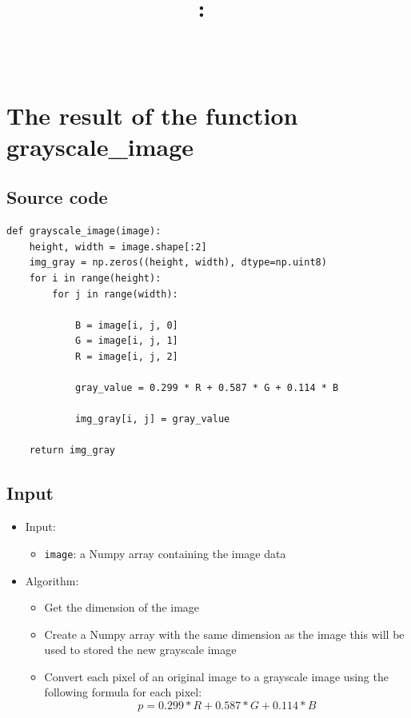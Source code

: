 \documentclass{article}
\title{
\vspace{-1in}
\textmd{\textbf{\hmwkClass:\ \hmwkTitle} \\ \hmwkAuthorName}\\
}
\author{}
\date{}
\begin{document}
\maketitle


\section{The result of the function grayscale\_image}

\subsection{Source code}
\begin{lstlisting}[caption={Code of grayscale\_image() function}, label={grayscale\_image}]
def grayscale_image(image):
    height, width = image.shape[:2]
    img_gray = np.zeros((height, width), dtype=np.uint8)
    for i in range(height):
        for j in range(width):
    
            B = image[i, j, 0]
            G = image[i, j, 1]
            R = image[i, j, 2]
            
            gray_value = 0.299 * R + 0.587 * G + 0.114 * B

            img_gray[i, j] = gray_value

    return img_gray
\end{lstlisting}

\subsection{Input}
\begin{itemize}
    \item Input: 
    \begin{itemize}
        \item \lstinline{image}: a Numpy array containing the image data
    \end{itemize}
    \item Algorithm:
    \begin{itemize}
        \item Get the dimension of the image
        \item Create a Numpy array with the same dimension as the image this will be used to stored the new grayscale image
        \item Convert each pixel of an original image to a grayscale image using the following formula for each pixel:
        \[p = 0.299 * R + 0.587 * G + 0.114 * B \]
    \end{itemize}
\end{itemize}
\end{document}
